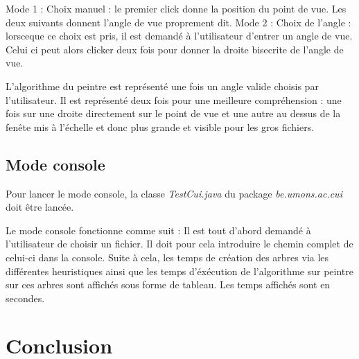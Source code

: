 \documentclass[11pt,a4paper]{article}
\theoremstyle{definition}
\theoremstyle{remark}
\begin{document}
Mode 1 : Choix manuel : le premier click donne la position du point de vue. Les deux suivants donnent l'angle de vue proprement dit.
Mode 2 : Choix de l'angle : lorsceque ce choix est pris, il est demandé à l'utilisateur d'entrer un angle de vue. Celui ci peut alors clicker deux fois pour donner la droite bisecrite de l'angle de vue.

L'algorithme du peintre est représenté une fois un angle valide choisis par l'utilisateur. Il est représenté deux fois pour une meilleure compréhension : une fois sur une droite directement sur le point de vue et une autre au dessus de la fenête mis à l'échelle et donc plus grande et visible pour les gros fichiers.

\subsection{Mode console}

Pour lancer le mode console, la classe \textit{TestCui.java} du package \textit{be.umons.ac.cui} doit être lancée.

Le mode console fonctionne comme suit :
Il est tout d'abord demandé à l'utilisateur de choisir un fichier. Il doit pour cela introduire le chemin complet de celui-ci dans la console. Suite à cela, les temps de création des arbres via les différentes heuristiques ainsi que les temps d'éxécution de l'algorithme sur peintre sur ces arbres sont affichés sous forme de tableau. Les temps affichés sont en secondes. 

\section*{Conclusion}

\end{document}
